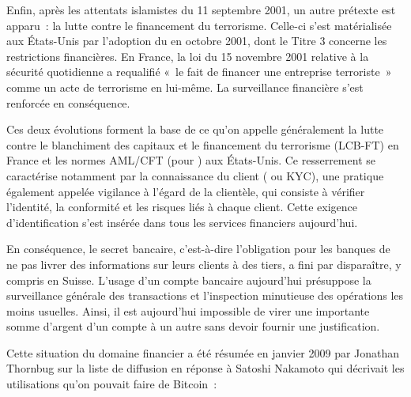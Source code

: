 Enfin, après les attentats islamistes du 11 septembre 2001, un autre prétexte est apparu~: la lutte contre le financement du terrorisme. Celle-ci s'est matérialisée aux États-Unis par l'adoption du  en octobre 2001, dont le Titre 3 concerne les restrictions financières. En France, la loi du 15 novembre 2001 relative à la sécurité quotidienne a requalifié «~le fait de financer une entreprise terroriste~» comme un acte de terrorisme en lui-même. La surveillance financière s'est renforcée en conséquence. %

Ces deux évolutions forment la base de ce qu'on appelle généralement la lutte contre le blanchiment des capitaux et le financement du terrorisme (LCB-FT) en France et les normes AML/CFT (pour ) aux États-Unis. Ce resserrement se caractérise notamment par la connaissance du client ( ou KYC), une pratique également appelée vigilance à l'égard de la clientèle, qui consiste à vérifier l'identité, la conformité et les risques liés à chaque client. Cette exigence d'identification s'est insérée dans tous les services financiers aujourd'hui.

En conséquence, le secret bancaire, c'est-à-dire l'obligation pour les banques de ne pas livrer des informations sur leurs clients à des tiers, a fini par disparaître, y compris en Suisse. L'usage d'un compte bancaire aujourd'hui présuppose la surveillance générale des transactions et l'inspection minutieuse des opérations les moins usuelles. Ainsi, il est aujourd'hui impossible de virer une importante somme d'argent d'un compte à un autre sans devoir fournir une justification.

Cette situation du domaine financier a été résumée en janvier 2009 par Jonathan Thornbug sur la liste de diffusion en réponse à Satoshi Nakamoto qui décrivait les utilisations qu'on pouvait faire de Bitcoin~:

